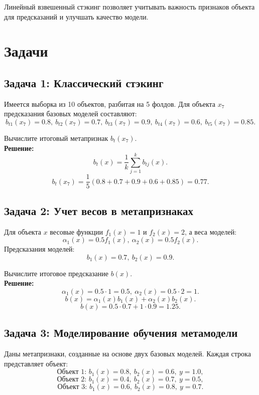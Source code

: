 Линейный взвешенный стэкинг позволяет учитывать важность признаков объекта для предсказаний и улучшать качество модели.


\section*{Задачи}

\subsection*{Задача 1: Классический стэкинг}

Имеется выборка из 10 объектов, разбитая на 5 фолдов. Для объекта \( x_7 \) предсказания базовых моделей составляют:
\[
    b_{t1}(x_7) = 0.8, \ b_{t2}(x_7) = 0.7, \ b_{t3}(x_7) = 0.9, \ b_{t4}(x_7) = 0.6, \ b_{t5}(x_7) = 0.85.
\]

Вычислите итоговый метапризнак \( b_t(x_7) \).
\\
\textbf{Решение:}
\[
    b_t(x) = \frac{1}{k} \sum_{j=1}^k b_{tj}(x).
\]
\[
    b_t(x_7) = \frac{1}{5} (0.8 + 0.7 + 0.9 + 0.6 + 0.85) = 0.77.
\]



\subsection*{Задача 2: Учет весов в метапризнаках}

Для объекта \( x \) весовые функции \( f_1(x) = 1 \) и \( f_2(x) = 2 \), а веса моделей:
\[
    \alpha_1(x) = 0.5 f_1(x), \ \alpha_2(x) = 0.5 f_2(x).
\]
Предсказания моделей:
\[
    b_1(x) = 0.7, \ b_2(x) = 0.9.
\]

Вычислите итоговое предсказание \( b(x) \).
\\
\textbf{Решение:}
\[
    \alpha_1(x) = 0.5 \cdot 1 = 0.5, \ \alpha_2(x) = 0.5 \cdot 2 = 1.
\]
\[
    b(x) = \alpha_1(x) b_1(x) + \alpha_2(x) b_2(x).
\]
\[
    b(x) = 0.5 \cdot 0.7 + 1 \cdot 0.9 = 1.25.
\]



\subsection*{Задача 3: Моделирование обучения метамодели}

Даны метапризнаки, созданные на основе двух базовых моделей. Каждая строка представляет объект:
\[
    \text{Объект 1: } b_1(x) = 0.8, \ b_2(x) = 0.6, \ y = 1.0,
\]
\[
    \text{Объект 2: } b_1(x) = 0.4, \ b_2(x) = 0.7, \ y = 0.5,
\]
\[
    \text{Объект 3: } b_1(x) = 0.6, \ b_2(x) = 0.8, \ y = 0.7.
\]

